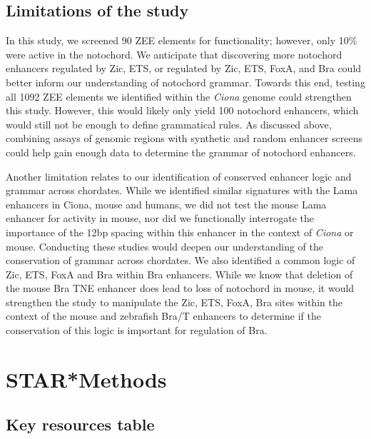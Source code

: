 \subsection{Limitations of the study}

In this study, we screened 90 ZEE elements for functionality; however, only 10\% were active in the notochord. We anticipate that discovering more notochord enhancers regulated by Zic, ETS, or regulated by Zic, ETS, FoxA, and Bra could better inform our understanding of notochord grammar. Towards this end, testing all 1092 ZEE elements we identified within the \textit{Ciona} genome could strengthen this study. However, this would likely only yield 100 notochord enhancers, which would still not be enough to define grammatical rules. As discussed above, combining assays of genomic regions with synthetic and random enhancer screens could help gain enough data to determine the grammar of notochord enhancers. 

Another limitation relates to our identification of conserved enhancer logic and grammar across chordates. While we identified similar signatures with the Lama enhancers in Ciona, mouse and humans, we did not test the mouse Lama enhancer for activity in mouse, nor did we functionally interrogate the importance of the 12bp spacing within this enhancer in the context of \textit{Ciona} or mouse. Conducting these studies would deepen our understanding of the conservation of grammar across chordates. We also identified a common logic of Zic, ETS, FoxA and Bra within Bra enhancers. While we know that deletion of the mouse Bra TNE enhancer does lead to loss of notochord in mouse, it would strengthen the study to manipulate the Zic, ETS, FoxA, Bra sites within the context of the mouse and zebrafish Bra/T enhancers to determine if the conservation of this logic is important for regulation of Bra.

\section{STAR*Methods}

\subsection{Key resources table}

